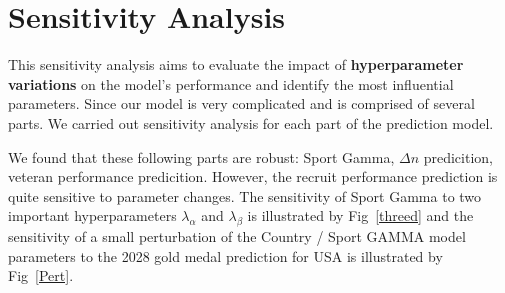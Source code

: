 \documentclass{mcmthesis}
\begin{document}


\section{Sensitivity Analysis}
\label{sec:9}
This sensitivity analysis aims to evaluate the impact of \textbf{hyperparameter variations} on the model’s performance and identify the most influential parameters. Since our model is very complicated and is comprised of several parts. We carried out sensitivity analysis for each part of the prediction model.

We found that these following parts are robust: Sport Gamma, $\Delta n$ predicition, veteran performance predicition. However, the recruit performance prediction is quite sensitive to parameter changes. The sensitivity of Sport Gamma to two important hyperparameters $\lambda_\alpha$ and $\lambda_\beta$ is illustrated by Fig~\ref{threed} and the sensitivity of a small perturbation of the Country / Sport GAMMA model parameters to the 2028 gold medal prediction for USA is illustrated by Fig~\ref{Pert}.
\end{document}
